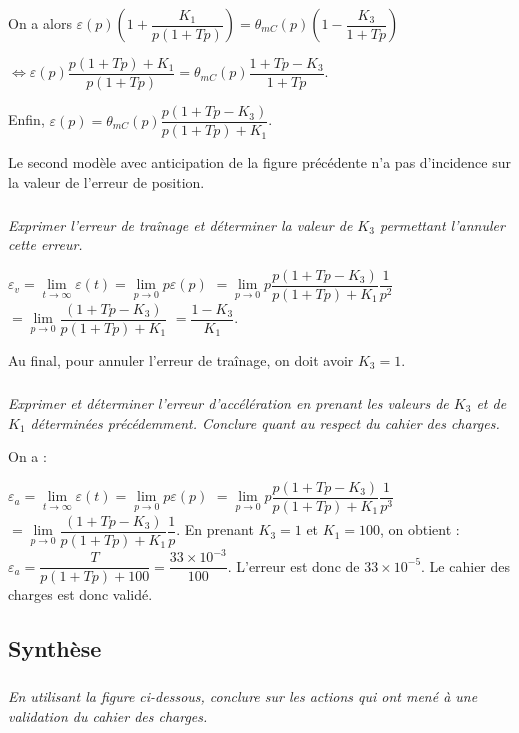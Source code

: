 \documentclass[10pt,fleqn]{article} %
\begin{document}
\begin{multicols}{2}
\begin{corrige}
On a alors 
$
\varepsilon(p)  \left(1+ \dfrac{K_1 }{p \left( 1+Tp\right)} \right)
=  \theta_{mC}(p)\left(1-  \dfrac{K_3}{ 1+Tp}\right)$

$\Leftrightarrow
\varepsilon(p)  \dfrac{p \left( 1+Tp\right)+K_1 }{p \left( 1+Tp\right)} 
=  \theta_{mC}(p)  \dfrac{ 1+Tp-K_3  }{ 1+Tp}
$.

Enfin,  
$\varepsilon(p) = \theta_{mC}(p)\dfrac{p\left( 1+Tp-K_3\right) }{p \left( 1+Tp\right)+K_1}
$.
\end{corrige}

\else
\fi

Le second modèle avec anticipation de la figure précédente n’a pas d’incidence sur la valeur de l’erreur de position.

\subparagraph{}\textit{Exprimer l’erreur de traînage et déterminer la valeur de $K_3$ permettant l’annuler cette erreur.}

\ifprof

\begin{corrige}
$\varepsilon_v = \lim\limits_{t\to \infty} \varepsilon(t)= \lim\limits_{p\to 0} p\varepsilon(p) $ 
$= \lim\limits_{p\to 0} p \dfrac{p\left( 1+Tp-K_3\right) }{p \left( 1+Tp\right)+K_1} \dfrac {1}{p^2}$
$= \lim\limits_{p\to 0}  \dfrac{\left( 1+Tp-K_3\right) }{p \left( 1+Tp\right)+K_1}$
$=\dfrac{1-K_3}{K_1}$.

Au final, pour annuler l'erreur de traînage, on doit avoir $K_3=1$.
\end{corrige}
\else
\fi
\subparagraph{}\textit{Exprimer et déterminer l’erreur d’accélération en prenant les valeurs de $K_3$ et de $K_1$ déterminées
précédemment. Conclure quant au respect du cahier des charges.}

\ifprof

On a : 

\begin{corrige}
$\varepsilon_a = \lim\limits_{t\to \infty} \varepsilon(t)= \lim\limits_{p\to 0} p\varepsilon(p) $ 
$= \lim\limits_{p\to 0} p \dfrac{p\left( 1+Tp-K_3\right) }{p \left( 1+Tp\right)+K_1} \dfrac {1}{p^3}$
$= \lim\limits_{p\to 0} \dfrac{\left( 1+Tp-K_3\right) }{p \left( 1+Tp\right)+K_1} \dfrac {1}{p}$. En prenant $K_3=1$ et $K_1=100$, on obtient :
$\varepsilon_a = \dfrac{ T}{p \left( 1+Tp\right)+100}=\dfrac{33\times 10^{-3}}{100} $.
L'erreur est donc de $33\times 10^{-5}$. Le cahier des charges est donc validé. 

\end{corrige}
\else
\fi

\subsection*{Synthèse}
\subparagraph{}
\textit{En utilisant la figure ci-dessous, conclure sur les actions qui ont mené à une validation du cahier des charges.}
\end{multicols}
\end{document}

